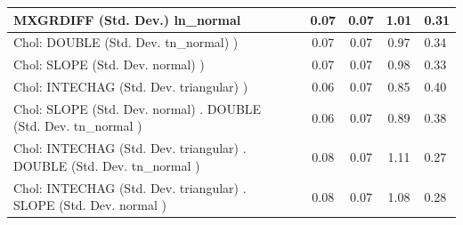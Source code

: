 \begin{table}
\begin{center}
\begin{tabular}{|l|l|c|c|c|l|}
			\hline
			MXGRDIFF (Std. Dev.) ln_normal &  & 0.07 & 0.07 & 1.01 & 0.31 \\
			\hline
			 Chol: DOUBLE (Std. Dev. tn_normal) ) &  & 0.07 & 0.07 & 0.97 & 0.34 \\
			\hline
			 Chol: SLOPE (Std. Dev. normal) ) &  & 0.07 & 0.07 & 0.98 & 0.33 \\
			\hline
			 Chol: INTECHAG (Std. Dev. triangular) ) &  & 0.06 & 0.07 & 0.85 & 0.40 \\
			\hline
			 Chol: SLOPE (Std. Dev. normal) . DOUBLE (Std. Dev.   tn_normal ) &  & 0.06 & 0.07 & 0.89 & 0.38 \\
			\hline
			 Chol: INTECHAG (Std. Dev. triangular) . DOUBLE (Std. Dev.   tn_normal ) &  & 0.08 & 0.07 & 1.11 & 0.27 \\
			\hline
			 Chol: INTECHAG (Std. Dev. triangular) . SLOPE (Std. Dev.   normal ) &  & 0.08 & 0.07 & 1.08 & 0.28 \\
			\hline
		\end{tabular}
	\end{center}
\end{table}